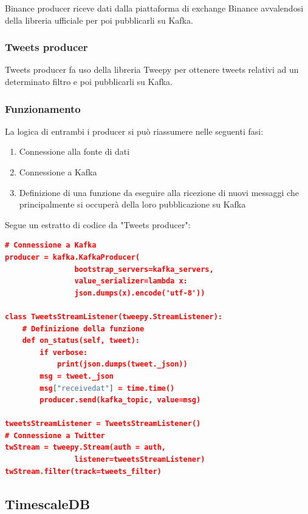 Binance producer riceve dati dalla piattaforma di exchange Binance \cite{binance}
avvalendosi della libreria ufficiale per poi pubblicarli su Kafka.

\subsubsection{Tweets producer}

Tweets producer fa uso della libreria Tweepy \cite{tweepy} per ottenere tweets relativi
ad un determinato filtro e poi pubblicarli su Kafka.

\subsubsection{Funzionamento}
La logica di entrambi i producer si può riassumere nelle seguenti fasi:
\begin{enumerate}
    \item Connessione alla fonte di dati
    \item Connessione a Kafka
    \item Definizione di una funzione da eseguire alla ricezione di nuovi messaggi che
          principalmente si occuperà della loro pubblicazione su Kafka
\end{enumerate}

Segue un estratto di codice da "Tweets producer":

\begin{lstlisting}[language=json,firstnumber=1]
# Connessione a Kafka
producer = kafka.KafkaProducer(
                bootstrap_servers=kafka_servers,
                value_serializer=lambda x: 
                json.dumps(x).encode('utf-8'))

class TweetsStreamListener(tweepy.StreamListener):
    # Definizione della funzione
    def on_status(self, tweet):
        if verbose:
            print(json.dumps(tweet._json))
        msg = tweet._json
        msg["receivedat"] = time.time()
        producer.send(kafka_topic, value=msg)

tweetsStreamListener = TweetsStreamListener()
# Connessione a Twitter
twStream = tweepy.Stream(auth = auth,
                listener=tweetsStreamListener)
twStream.filter(track=tweets_filter)
\end{lstlisting}

\subsection{TimescaleDB}

